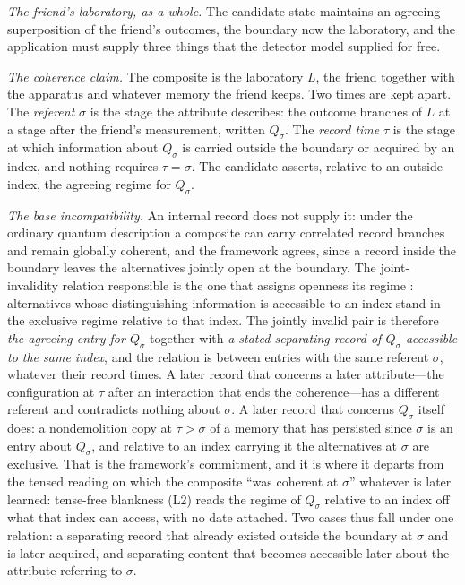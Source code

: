 \emph{The friend's laboratory, as a whole.} The candidate state maintains an agreeing superposition of the friend's outcomes, the boundary now the laboratory, and the application must supply three things that the detector model supplied for free.

\emph{The coherence claim.} The composite is the laboratory $L$, the friend together with the apparatus and whatever memory the friend keeps. Two times are kept apart. The \emph{referent} $\sigma$ is the stage the attribute describes: the outcome branches of $L$ at a stage after the friend's measurement, written $Q_\sigma$. The \emph{record time} $\tau$ is the stage at which information about $Q_\sigma$ is carried outside the boundary or acquired by an index, and nothing requires $\tau = \sigma$. The candidate asserts, relative to an outside index, the agreeing regime for $Q_\sigma$.

\emph{The base incompatibility.} An internal record does not supply it: under the ordinary quantum description a composite can carry correlated record branches and remain globally coherent, and the framework agrees, since a record inside the boundary leaves the alternatives jointly open at the boundary. The joint-invalidity relation responsible is the one that assigns openness its regime \cite{AethusUnion, Aethus}: alternatives whose distinguishing information is accessible to an index stand in the exclusive regime relative to that index. The jointly invalid pair is therefore \emph{the agreeing entry for $Q_\sigma$} together with \emph{a stated separating record of $Q_\sigma$ accessible to the same index}, and the relation is between entries with the same referent $\sigma$, whatever their record times. A later record that concerns a later attribute---the configuration at $\tau$ after an interaction that ends the coherence---has a different referent and contradicts nothing about $\sigma$. A later record that concerns $Q_\sigma$ itself does: a nondemolition copy at $\tau > \sigma$ of a memory that has persisted since $\sigma$ is an entry about $Q_\sigma$, and relative to an index carrying it the alternatives at $\sigma$ are exclusive. That is the framework's commitment, and it is where it departs from the tensed reading on which the composite ``was coherent at $\sigma$'' whatever is later learned: tense-free blankness (L2) reads the regime of $Q_\sigma$ relative to an index off what that index can access, with no date attached. Two cases thus fall under one relation: a separating record that already existed outside the boundary at $\sigma$ and is later acquired, and separating content that becomes accessible later about the attribute referring to $\sigma$.

